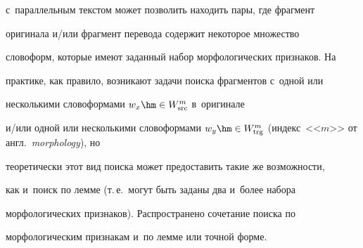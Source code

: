 с~параллельным текстом может позволить находить пары, где фрагмент 


оригинала и\!/\!или фрагмент перевода содержит некоторое множество 


словоформ, которые имеют заданный набор морфологических признаков. На 


практике, как правило, возникают задачи поиска фрагментов с~одной или 


несколькими словоформами $w_x\hm\in W^m_{\mathrm{src}}$ в~оригинале 


и\!/\!или одной или несколькими словоформами $w_y\hm\in 


W^m_{\mathrm{trg}}$ (индекс~<<$m$>> от англ.\ \textit{morphology}), но 


теоретически этот вид поиска может предоста\-вить такие же возможности, 


как и~поиск по лемме (т.\,е.\ могут быть заданы два и~более набора 


морфологических признаков). Распространено сочетание поиска по 


морфологическим признакам и~по лемме или точ\-ной форме.





